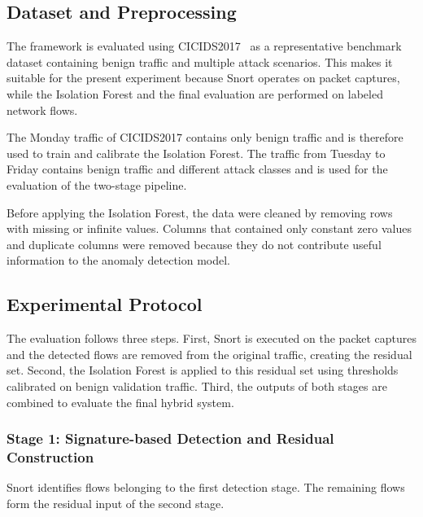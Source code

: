 \documentclass[conference]{IEEEtran}
\begin{document}
\subsection{Dataset and Preprocessing}
\label{subsec:dataset-preprocessing}
The framework is evaluated using CICIDS2017~\cite{sharafaldin2018} as a representative benchmark
dataset containing benign traffic and multiple attack scenarios.
This makes it suitable for the present experiment because Snort operates on packet captures, while the Isolation Forest and the final evaluation are performed on labeled network flows.

The Monday traffic of CICIDS2017 contains only benign traffic and is therefore used to train and calibrate the Isolation Forest. The traffic from Tuesday to Friday contains benign traffic and different attack classes and is used for the evaluation of the two-stage pipeline. 


Before applying the Isolation Forest, the data were cleaned by removing rows with missing or infinite values. Columns that contained only constant zero values and duplicate columns were removed because they do not contribute useful information to the anomaly detection model.

\subsection{Experimental Protocol}
\label{subsec:experimental-protocol}
The evaluation follows three steps. First, Snort is executed on the packet
captures and the detected flows are removed from the original traffic,
creating the residual set. Second, the Isolation Forest is applied to this
residual set using thresholds calibrated on benign validation traffic. Third,
the outputs of both stages are combined to evaluate the final hybrid system.

\subsubsection{Stage 1: Signature-based Detection and Residual Construction}
\label{subsec:snort-residuals}
Snort identifies flows belonging to the first detection stage. The remaining
flows form the residual input of the second stage.
\end{document}
